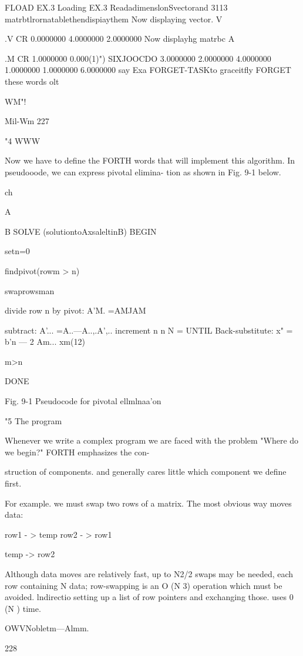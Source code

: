 FLOAD EX.3 Loading EX.3
ReadadimenslonSvectorand 3113 matrbtlrornatablethendispiaythem
Now displaying vector.
V{ .V CR
0.0000000
4.0000000
2.0000000
Now displayhg matrbc
A{{ .M CR
1.0000000 0.000(1)") SIXJOOCDO
3.0000000 2.0000000 4.0000000
1.0000000 1.0000000 6.0000000
say Exa FORGET-TASKto graceitfly FORGET these words olt

WM"!

Mil-Wm 227

"4 WWW

Now we have to define the FORTH words that will implement
this algorithm. In pseudooode, we can express pivotal elimina-
tion as shown in Fig. 9-1 below.

 

ch

 

 

 

A{{ B{ }}SOLVE (solutiontoAxsaleltinB)
BEGIN

setn=0

findpivot(rowm > n)

swaprowsman

divide row n by pivot: A'M. =AMJAM

subtract: A'... =A..—A..,.A',..
increment n
n N =
UNTIL
Back-substitute: x" = b'n — 2 Am... xm(12)

m>n

DONE

 

 

Fig. 9-1 Pseudocode for pivotal ellmlnaa'on

"5 The program

Whenever we write a complex program we are faced with the
problem "Where do we begin?" FORTH emphasizes the con-

struction of components. and generally cares little which component
we define first.

For example. we must swap two rows of a matrix. The most
obvious way moves data:

row1 - > temp
row2 - > row1

temp -> row2

Although data moves are relatively fast, up to N2/2 swaps may be
needed, each row containing N data; row-swapping is an O (N 3)
operation which must be avoided. lndirectio setting up a list of
row pointers and exchanging those. uses 0 (N ) time.

OWVNobletm—Almm.

228

}}}}
